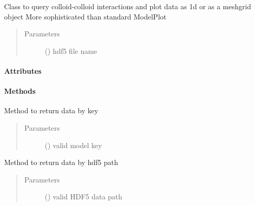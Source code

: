 \documentclass[letterpaper,10pt,english]{sphinxmanual}
\begin{document}
\begin{fulllineitems}
\label{\detokenize{index:lb_colloids.Colloids.Colloid_output.CCModelPlot}}
Class to query colloid-colloid interactions
and plot data as 1d or as a meshgrid object
More sophisticated than standard ModelPlot
\begin{quote}\begin{description}
\item[{Parameters}] \leavevmode
{} () \textendash{} hdf5 file name

\end{description}\end{quote}
\paragraph{Attributes}
\paragraph{Methods}

\begin{fulllineitems}
\label{\detokenize{index:lb_colloids.Colloids.Colloid_output.CCModelPlot.get_data}}
Method to return data by key
\begin{quote}\begin{description}
\item[{Parameters}] \leavevmode
{} () \textendash{} valid model key

\end{description}\end{quote}

\end{fulllineitems}


\begin{fulllineitems}
\label{\detokenize{index:lb_colloids.Colloids.Colloid_output.CCModelPlot.get_data_by_path}}
Method to return data by hdf5 path
\begin{quote}\begin{description}
\item[{Parameters}] \leavevmode
{} () \textendash{} valid HDF5 data path


\end{description}
\end{quote}
\end{fulllineitems}
\end{fulllineitems}
\end{document}
